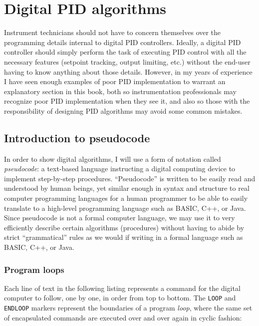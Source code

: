 \filbreak
\section{Digital PID algorithms}

Instrument technicians should not have to concern themselves over the programming details internal to digital PID controllers.  Ideally, a digital PID controller should simply perform the task of executing PID control with all the necessary features (setpoint tracking, output limiting, etc.) without the end-user having to know anything about those details.  However, in my years of experience I have seen enough examples of poor PID implementation to warrant an explanatory section in this book, both so instrumentation professionals may recognize poor PID implementation when they see it, and also so those with the responsibility of designing PID algorithms may avoid some common mistakes.







\filbreak
\subsection{Introduction to pseudocode}

\label{pseudocode}

In order to show digital algorithms, I will use a form of notation called \textit{pseudocode}: a text-based language instructing a digital computing device to implement step-by-step procedures.  ``Pseudocode'' is written to be easily read and understood by human beings, yet similar enough in syntax and structure to real computer programming languages for a human programmer to be able to easily translate to a high-level programming language such as BASIC, C++, or Java.  Since pseudocode is not a formal computer language, we may use it to very efficiently describe certain algorithms (procedures) without having to abide by strict ``grammatical'' rules as we would if writing in a formal language such as BASIC, C++, or Java.  


\filbreak
\subsubsection{Program loops}

Each line of text in the following listing represents a command for the digital computer to follow, one by one, in order from top to bottom.  The \texttt{LOOP} and \texttt{ENDLOOP} markers represent the boundaries of a program \textit{loop}, where the same set of encapsulated commands are executed over and over again in cyclic fashion:  

